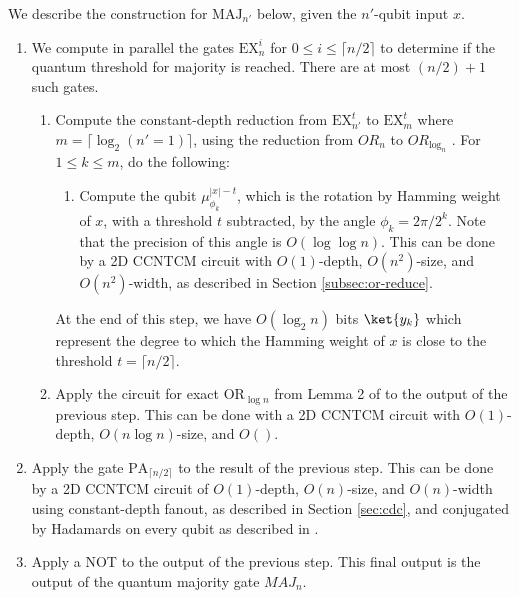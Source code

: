 We describe the construction for $\text{MAJ}_{n'}$ below, given the
$n'$-qubit input $x$.

\begin{enumerate}

\item
We compute in parallel the gates $\text{EX}^i_{n}$ for
$0 \le i \le \lceil n/2 \rceil$ to determine if the quantum
threshold for majority is reached. There are at most $(n/2) + 1$
such gates.

\begin{enumerate}
\item 
Compute the constant-depth reduction from $\text{EX}^t_{n'}$ to
$\text{EX}^t_{m}$ where $m = \lceil \log_2(n'=1) \rceil$, using
the reduction from $OR_n$ to $OR_{\log_n}$ \cite{Hoyer2002}.
For $1 \le k \le m$, do the following:

\begin{enumerate}
\item
Compute the qubit $\mu^{|x|-t}_{\phi_k}$, which is the rotation by Hamming 
weight of $x$, with a threshold $t$ subtracted, by the angle $\phi_k = 2\pi / 2^k$. Note that the precision
of this angle is $O(\log \log n)$. This can be done by a 2D CCNTCM circuit
with $O(1)$-depth, $O(n^2)$-size, and $O(n^2)$-width, as described in
Section \ref{subsec:or-reduce}.
\end{enumerate}

At the end of this step, we have $O(\log_2 n)$ bits $\ket{y_k}$ which 
represent the degree to which the Hamming weight of $x$ is close to the
threshold $t = \lceil n/2 \rceil$.

\item
Apply the circuit for exact $\text{OR}_{\log n}$ from Lemma 2 of
\cite{Takahashi2011} to the output of the previous step. This can
be done with a 2D CCNTCM circuit with $O(1)$-depth, $O(n \log n)$-size,
and $O()$.

\end{enumerate}

\item
Apply the gate $\text{PA}_{\lceil n/2 \rceil}$ to the result of
the previous step. This can be done by a 2D CCNTCM circuit of
$O(1)$-depth, $O(n)$-size, and $O(n)$-width using constant-depth
fanout, as described in Section \ref{sec:cdc}, and conjugated by
Hadamards on every qubit as described in \cite{Moore1998}.

\item
Apply a NOT to the output of the previous step. This final
output is the output of the quantum majority gate $MAJ_{n}$.

\end{enumerate}


